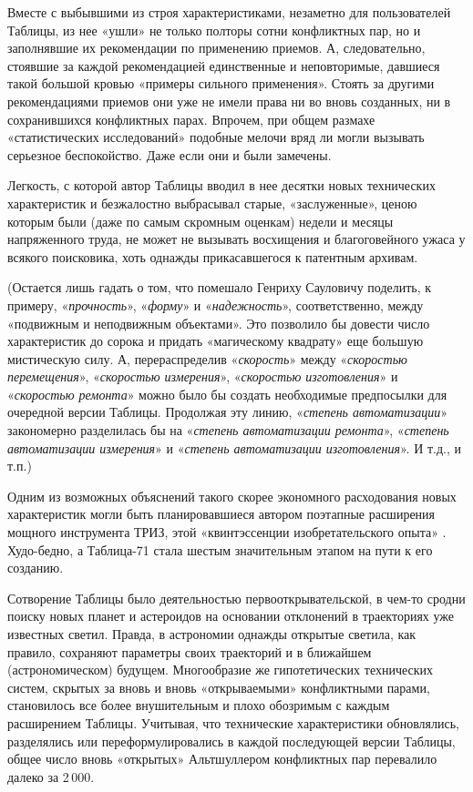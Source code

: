 \documentclass[11pt,a4paper]{article}
\begin{document}
Вместе с выбывшими из строя характеристиками, незаметно для пользователей
Таблицы, из нее «ушли» не только полторы сотни конфликтных пар, но и
заполнявшие их рекомендации по применению приемов. А, следовательно, стоявшие
за каждой рекомендацией единственные и неповторимые, давшиеся такой большой
кровью «примеры сильного применения». Стоять за другими рекомендациями приемов
они уже не имели права ни во вновь созданных, ни в сохранившихся конфликтных
парах. Впрочем, при общем размахе «статистических исследований» подобные
мелочи вряд ли могли вызывать серьезное беспокойство. Даже если они и были
замечены.

Легкость, с которой автор Таблицы вводил в нее десятки новых технических
характеристик и безжалостно выбрасывал старые, «заслуженные», ценою которым
были (даже по самым скромным оценкам) недели и месяцы напряженного труда, не
может не вызывать восхищения и благоговейного ужаса у всякого поисковика, хоть
однажды прикасавшегося к патентным архивам.

(Остается лишь гадать о том, что помешало Генриху Сауловичу поделить, к
примеру, «\emph{прочность}», «\emph{форму}» и «\emph{надежность}»,
соответственно, между «подвижным и неподвижным объектами». Это позволило бы
довести число характеристик до сорока и придать «магическому квадрату» еще
большую мистическую силу. А, перераспределив «\emph{скорость}» между
«\emph{скоростью перемещения}», «\emph{скоростью измерения}», «\emph{скоростью
  изготовления}» и «\emph{скоростью ремонта}» можно было бы создать
необходимые предпосылки для очередной версии Таблицы. Продолжая эту линию,
«\emph{степень автоматизации}» закономерно разделилась бы на «\emph{степень
  автоматизации ремонта}», «\emph{степень автоматизации измерения}» и
«\emph{степень автоматизации изготовления}». И т.д., и т.п.)

Одним из возможных объяснений такого скорее экономного расходования новых
характеристик могли быть планировавшиеся автором поэтапные расширения мощного
инструмента ТРИЗ, этой «квинтэссенции изобретательского опыта»
\cite{Altshuller1966}.  Худо-бедно, а Таблица-71 стала шестым значительным
этапом на пути к его созданию.

Сотворение Таблицы было деятельностью первооткрывательской, в чем-то сродни
поиску новых планет и астероидов на основании отклонений в траекториях уже
известных светил. Правда, в астрономии однажды открытые светила, как правило,
сохраняют параметры своих траекторий и в ближайшем (астрономическом) будущем.
Многообразие же гипотетических технических систем, скрытых за вновь и вновь
«открываемыми» конфликтными парами, становилось все более внушительным и плохо
обозримым с каждым расширением Таблицы. Учитывая, что технические
характеристики обновлялись, разделялись или переформулировались в каждой
последующей версии Таблицы, общее число вновь «открытых» Альтшуллером
конфликтных пар перевалило далеко за 2\,000.
\end{document}
